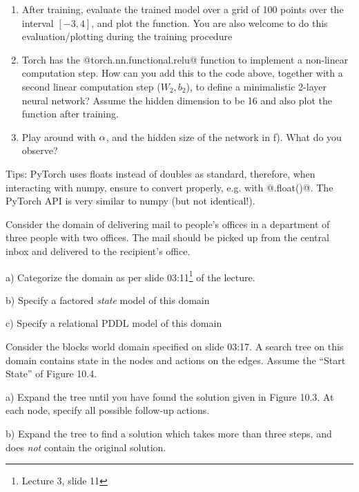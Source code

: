 \begin{enumerate}
\begin{items}
  \end{items}

\item After training, evaluate the trained model over a grid of 100 points over the interval $[-3,4]$, and plot the function. You are also welcome to do this evaluation/plotting during the training procedure

\item Torch has the @torch.nn.functional.relu@ function to implement a non-linear computation step. How can you add this to the code above, together with a second linear computation step ($W_2, b_2$), to define a minimalistic 2-layer neural network? Assume the hidden dimension to be 16 and also plot the function after training.

\item Play around with $\alpha$, and the hidden size of the network in f). What do you observe?
\end{enumerate}

Tips: PyTorch uses floats instead of doubles as standard, therefore, when interacting with numpy, ensure to convert properly, e.g. with @.float()@. The PyTorch API is very similar to numpy (but not identical!).




Consider the domain of delivering mail to people's offices in a department
of three people with two offices. The mail should be picked up from the central
inbox and delivered to the recipient's office.

a) Categorize the domain as per slide 03:11\footnote{Lecture 3, slide
11} of the lecture.

b) Specify a factored \emph{state} model of this domain

c) Specify a relational PDDL model of this domain



Consider the blocks world domain specified on slide 03:17. A search
tree on this domain contains state in the nodes and actions on the
edges. Assume the ``Start State'' of Figure 10.4.

a) Expand the tree until you have found the solution given in Figure 10.3. At 
each node, specify all possible follow-up actions.

b) Expand the tree to find a solution which takes more than three steps, and 
does \emph{not} contain the original solution.

